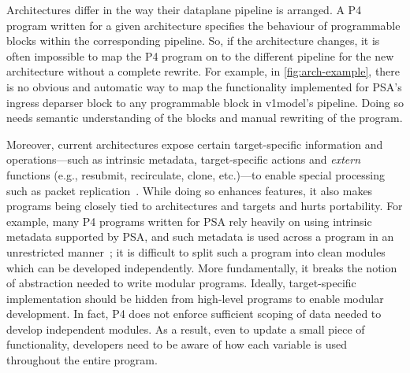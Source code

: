 \documentclass[letterpaper,twocolumn,10pt]{article}
\begin{document}
Architectures differ in the way their dataplane pipeline is arranged.
A P4 program written for a given architecture specifies the behaviour
of programmable blocks within the corresponding pipeline. So, if the
architecture changes, it is often impossible to map the P4 program
on to the different pipeline for the new architecture without a
complete rewrite. For example, in \cref{fig:arch-example}, there is no
obvious and automatic way to map the functionality implemented for
PSA's ingress deparser block to any programmable block in v1model's
pipeline. Doing so needs semantic understanding of the blocks and
manual rewriting of the program.

Moreover, current architectures expose certain target-specific
information and operations---such as intrinsic metadata,
target-specific actions and \emph{extern} functions (e.g., resubmit,
recirculate, clone, etc.)---to enable special processing such as
packet replication~\cite{simple_switch.md,psa}. While doing so
enhances features, it also makes programs being closely tied to
architectures and targets and hurts portability. For example, many P4
programs written for PSA rely heavily on using intrinsic metadata
supported by PSA, and such metadata is used across a program in an
unrestricted manner~\cite{switch.p4}; it is difficult to split such a
program into clean modules which can be developed independently.  More
fundamentally, it breaks the notion of abstraction needed to write
modular programs.  Ideally, target-specific implementation should be
hidden from high-level programs to enable modular development. In
fact, P4 does not enforce sufficient scoping of data needed to develop
independent modules. As a result, even to update a small piece of
functionality, developers need to be aware of how each variable is
used throughout the entire program.
\end{document}
